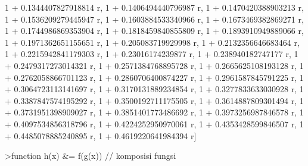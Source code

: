 \documentclass[a4paper,10pt]{article}
\begin{document}
\begin{eulernotebook}
\begin{eulercomment}
\begin{eulercomment}
\begin{eulercomment}
\begin{eulercomment}
\begin{eulercomment}
\begin{eulercomment}
\begin{eulercomment}
\begin{eulercomment}
\begin{eulercomment}
\begin{eulercomment}
\begin{eulercomment}
\begin{eulercomment}
\begin{eulercomment}
\begin{eulercomment}
\begin{eulercomment}
\begin{eulercomment}
\begin{eulercomment}
\begin{eulercomment}
\begin{eulercomment}
\begin{eulercomment}
\begin{eulercomment}
\begin{eulercomment}
\begin{eulercomment}
\begin{eulercomment}
\begin{euleroutput}
  1 + 0.1344407827918814 r, 1 + 0.1406494440796987 r, 
  1 + 0.1470420388903213 r, 1 + 0.1536209279445947 r, 
  1 + 0.1603884533340966 r, 1 + 0.1673469382869271 r, 
  1 + 0.1744986869353904 r, 1 + 0.1818459840855809 r, 
  1 + 0.1893910949889066 r, 1 + 0.1971362651155651 r, 
  1 + 0.205083719929998 r, 1 + 0.2132356646683464 r, 
  1 + 0.2215942841179303 r, 1 + 0.23016174239877 r, 
  1 + 0.238940182747177 r, 1 + 0.2479317273014321 r, 
  1 + 0.2571384768895728 r, 1 + 0.2665625108193128 r, 
  1 + 0.2762058866701123 r, 1 + 0.2860706400874227 r, 
  1 + 0.2961587845791225 r, 1 + 0.3064723113141697 r, 
  1 + 0.3170131889234854 r, 1 + 0.3277833633030928 r, 
  1 + 0.3387847574195292 r, 1 + 0.3500192711175505 r, 
  1 + 0.3614887809301494 r, 1 + 0.3731951398909027 r, 
  1 + 0.3851401773486692 r, 1 + 0.3973256987846578 r, 
  1 + 0.4097534856318796 r, 1 + 0.4224252950970061 r, 
  1 + 0.4353428599846507 r, 1 + 0.4485078885240895 r, 
  1 + 0.4619220641984394 r]
  
\end{euleroutput}
\begin{eulerprompt}
>function h(x) &= f(g(x)) // komposisi fungsi
\end{eulerprompt}
\begin{euleroutput}
  

\end{euleroutput}
\end{eulercomment}
\end{eulercomment}
\end{eulercomment}
\end{eulercomment}
\end{eulercomment}
\end{eulercomment}
\end{eulercomment}
\end{eulercomment}
\end{eulercomment}
\end{eulercomment}
\end{eulercomment}
\end{eulercomment}
\end{eulercomment}
\end{eulercomment}
\end{eulercomment}
\end{eulercomment}
\end{eulercomment}
\end{eulercomment}
\end{eulercomment}
\end{eulercomment}
\end{eulercomment}
\end{eulercomment}
\end{eulercomment}
\end{eulercomment}
\end{eulernotebook}
\end{document}
